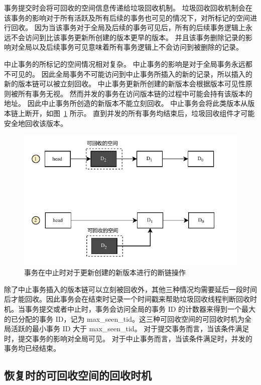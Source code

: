 事务提交时会将可回收的空间信息传递给垃圾回收机制。
垃圾回收回收机制会在该事务的影响对于所有活跃及所有后续的事务也可见的情况下，对所标记的空间进行回收。
因为当该事务对于全局及后续的事务可见后，所有的后续事务逻辑上永远不会访问到比该事务更新所创建的版本更早的版本。
并且该事务删除记录的影响对全局以及后续事务可见意味着所有事务逻辑上不会访问到被删除的记录。

中止事务的所标记的空间情况相对复杂。
中止事务的影响是对于全局事务永远都不可见的。
因此全局事务不可能访问到中止事务所插入的新的记录，所以插入的新的版本链可以被立刻回收。
中止事务更新所创建的新版本会根据版本可见性原则被所有事务无视。
然而并发的事务在访问版本链的过程中可能会持有该版本的地址。
因此中止事务所创造的新版本不能立刻回收。
中止事务会将此类版本从版本链上断开，如图~\ref{fig:insert-abort} 所示。
直到并发的所有事务均结束后，垃圾回收组件才可能安全地回收该版本。

\begin{figure}
    \centering
    \includegraphics[width=1\linewidth]{figures/gc-e.pdf}
    \caption{事务在中止时对于更新创建的新版本进行的断链操作}
    \label{fig:insert-abort}
\end{figure}

除了中止事务插入的版本链可以立刻被回收外，其他三种情况均需要延后一段时间后才能回收。因此事务会在结束时记录一个时间戳来帮助垃圾回收线程判断回收时机。当事务提交或者中止时，事务会访问全局的事务 ID 的计数器来得到一个最大的已分配的事务 ID，记为 max\_seen\_tid。这三种可回收空间的可回收时机为全局活跃的最小事务 ID 大于 max\_seen\_tid。
对于提交事务而言，当该条件满足时，提交事务的影响对全局可见。
对于中止事务而言，当该条件满足时，并发的事务均已经结束。


\subsection{恢复时的可回收空间的回收时机}

